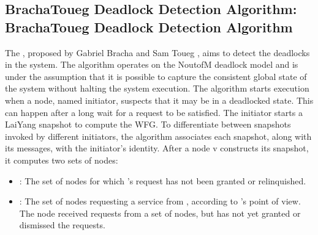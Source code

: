 \documentclass[letterpaper,10pt,english]{sphinxmanual}
\begin{document}
\subsection{Bracha\sphinxhyphen{}Toueg Deadlock Detection Algorithm: Bracha\sphinxhyphen{}Toueg Deadlock Detection Algorithm}
\label{\detokenize{docs/BrachaToueg/algorithm:bracha-toueg-deadlock-detection-algorithm-brachatouegalg}}
\sphinxAtStartPar
The {\hyperref[\detokenize{docs/BrachaToueg/algorithm:brachatouegdeadlockdetectionalgorithm}]{}}, proposed by Gabriel Bracha and Sam Toueg , aims to detect the deadlocks in the system. The algorithm operates on the N\sphinxhyphen{}out\sphinxhyphen{}of\sphinxhyphen{}M deadlock model and is under the assumption that it is possible to capture the consistent global state of the system without halting the system execution. The algorithm starts execution when a node, named initiator, suspects that it may be in a deadlocked state. This can happen after a long wait for a request to be satisfied. The initiator starts a Lai\sphinxhyphen{}Yang snapshot {\hyperref[\detokenize{docs/BrachaToueg/algorithm:laiyangsnapshotalgorithm}]{}} to compute the WFG. To differentiate between snapshots invoked by different initiators, the algorithm associates each snapshot, along with its messages, with the initiator’s identity. After a node v constructs its snapshot, it computes two sets of nodes:
\begin{itemize}
\item {} 
\sphinxAtStartPar
{}: The set of nodes  for which ’s request has not been granted or relinquished.

\item {} 
\sphinxAtStartPar
{}: The set of nodes requesting a service from , according to ’s point of view. The node  received requests from a set of nodes, but  has not yet granted or dismissed the requests.

\end{itemize}
\end{document}
